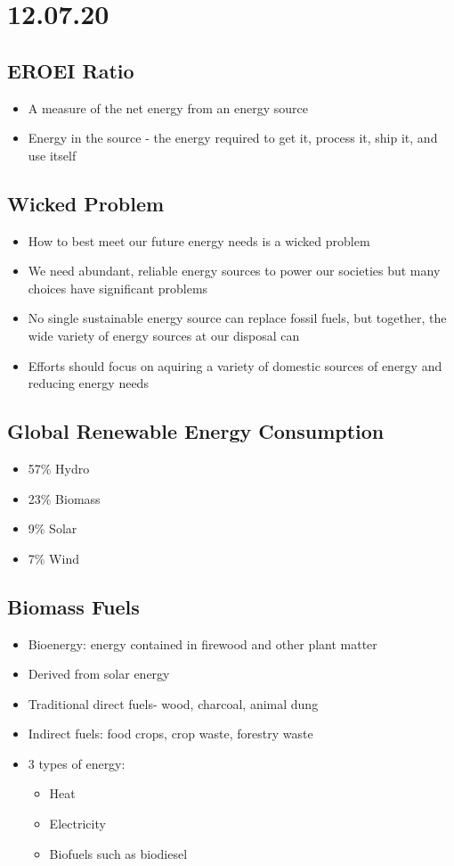 \documentclass[11pt]{article}
\author{Sudhan Chitgopkar}
\date{\today}
\title{}
\begin{document}
\tableofcontents

\section{12.07.20}
\label{sec:org8ba6a6a}
\subsection{EROEI Ratio}
\label{sec:org909ec6e}
\begin{itemize}
\item A measure of the net energy from an energy source
\item Energy in the source - the energy required to get it, process it, ship it, and use itself
\end{itemize}
\subsection{Wicked Problem}
\label{sec:org53aee18}
\begin{itemize}
\item How to best meet our future energy needs is a wicked problem
\item We need abundant, reliable energy sources to power our societies but many choices have significant problems
\item No single sustainable energy source can replace fossil fuels, but together, the wide variety of energy sources at our disposal can
\item Efforts should focus on aquiring a variety of domestic sources of energy and reducing energy needs
\end{itemize}
\subsection{Global Renewable Energy Consumption}
\label{sec:org39de474}
\begin{itemize}
\item 57\% Hydro
\item 23\% Biomass
\item 9\% Solar
\item 7\% Wind
\end{itemize}
\subsection{Biomass Fuels}
\label{sec:org4bd7ec6}
\begin{itemize}
\item Bioenergy: energy contained in firewood and other plant matter
\item Derived from solar energy
\item Traditional direct fuels- wood, charcoal, animal dung
\item Indirect fuels: food crops, crop waste, forestry waste
\item 3 types of energy:
\begin{itemize}
\item Heat
\item Electricity
\item Biofuels such as biodiesel
\end{itemize}
\end{itemize}
\end{document}
